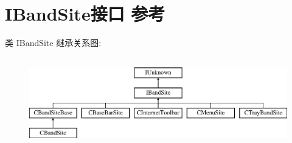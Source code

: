 \hypertarget{interface_i_band_site}{}\section{I\+Band\+Site接口 参考}
\label{interface_i_band_site}
类 I\+Band\+Site 继承关系图\+:\begin{figure}[H]
\begin{center}
\leavevmode
\includegraphics[height=3.929825cm]{interface_i_band_site}
\end{center}
\end{figure}
